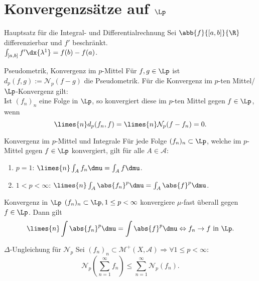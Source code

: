 \section*{Konvergenzsätze auf \( \Lp \)}

\begin{karte}{Hauptsatz für die Integral- und Differentialrechnung}
	Sei \( \abb{f}{[a,b]}{\R} \) differenzierbar und \(f'\) beschränkt. \\
	\( \int_{[a,b]} f' \dx{\lambda^1} = f(b) - f(a) \).
\end{karte}

\begin{karte}{Pseudometrik, Konvergenz im \(p\)-Mittel}
    Für \( f,g\in \Lp \) ist 
    \( d_p (f,g) := \mathcal{N}_p(f - g) \)
    die Pseudometrik. Für die Konvergenz im 
    \(p\)-ten Mittel/\(\Lp\)-Konvergenz gilt:\\
    Ist \( (f_n)_n \) eine Folge in \( \Lp \), 
    so konvergiert diese im \( p \)-ten Mittel gegen 
    \( f \in \Lp \), wenn 
    \[ \limes{n} d_p(f_n, f) = \limes{n} \mathcal{N}_p(f - f_n) = 0. \]
\end{karte}

\begin{karte}{Konvergenz im \(p\)-Mittel und Integrale}
    Für jede Folge \( (f_n)_n \subset \Lp \), welche 
    im \( p \)-Mittel gegen \( f\in \Lp \) konvergiert, 
    gilt für alle \( A \in \mathcal{A} \):
    \begin{enumerate}
        \item \( p = 1 \): \( \limes{n} \int_A f_n \dmu = \int_A f \dmu \).
        \item \( 1<p<\infty \): \( \limes{n} \int_A \abs{f_n}^p \dmu = \int_A \abs{f}^p \dmu \).
    \end{enumerate}
\end{karte}

\begin{karte}{Konvergenz in \( \Lp \)}
    \( (f_n)_n\subset \Lp, 1 \leq p < \infty \) 
    konvergiere \( \mu \)-fast überall gegen \( f\in\Lp \). 
    Dann gilt 
    \[ \limes{n} \int \abs{f_n}^p \dmu = \int \abs{f}^p \dmu 
    \Leftrightarrow f_n \rightarrow f \text{ in }\Lp. \]
\end{karte}

\begin{karte}{\( \Delta \)-Ungleichung für \( \mathcal{N}_p \)}
    Sei \( (f_n)_n \subset \mathcal{M}^+(X, \mathcal{A})
    \Rightarrow \forall 1 \leq p < \infty: \)
    \[ \mathcal{N}_p\left(\sum_{n=1}^\infty f_n\right) \leq \sum_{n=1}^\infty \mathcal{N}_p(f_n). \]
\end{karte}

